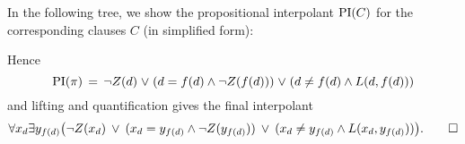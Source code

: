 \begin{exa}
{\begin{adjustwidth}{7em}{0em}
\begin{prooftree}

				\RightLabelm{\resrule{\resrulefac}{\id}}


				\insertBetweenHyps{\hskip -9em}


				\insertBetweenHyps{\hskip -10em}

				\RightLabelm{\resrule{\resruleres}{\id}}
				\BinaryInfCm{  \square }
			\end{prooftree}
		\end{adjustwidth}
		~

		~
	}

	In the following tree, we show the propositional interpolant $\operatorname{PI}(C)$ for the corresponding clauses $C$ (in simplified form):
	{
		\def\defaultHypSeparation{\hskip 4.4em}
		\begin{prooftree}

			\AxiomCm{ \top  }

			\AxiomCm{ \bot}
			\AxiomCm{ \top }

			\AxiomCm{ \bot}
			\AxiomCm{ \top }


			\AxiomCm{ \bot }


		\end{prooftree}
	}


	\noindent
	Hence
	\[\operatorname{PI}(\pi) \;\,{=}\;\,  \lnot Z(d) \;{\lor}\;  (d = f(d) \land \lnot Z(f(d)) ) \;{\lor}\; (d \neq f(d) \land L(d, f(d))) \]
	and lifting and quantification gives the final interpolant
	\[ \forall x_d \exists y_{f(d)} \big( \lnot Z(x_d) \;\,{\lor}\;\,  (x_d = y_{f(d)} \land \lnot Z(y_{f(d)}) ) \;\,{\lor}\;\, (x_d \neq y_{f(d)} \land L(x_d, y_{f(d)})) \big).
	\qedhere
\]
\end{exa}


